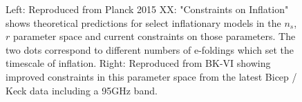 \documentclass[12pt]{article}
\begin{document}
\begin{figure}
	\caption{Left: Reproduced from Planck 2015 XX: "Constraints on
	Inflation"\cite{PlanckXX}
	shows theoretical predictions for select inflationary models in
	the $n_s$,$r$ parameter space and current constraints on those
	parameters. The two dots correspond to different numbers of e-foldings
	which set the timescale of inflation.
	Right: Reproduced from BK-VI \cite{BK6} showing improved constraints in this
	parameter space from the latest Bicep / Keck data including a 95GHz band.}
	\label{fig:status}
\end{figure}
\end{document}
